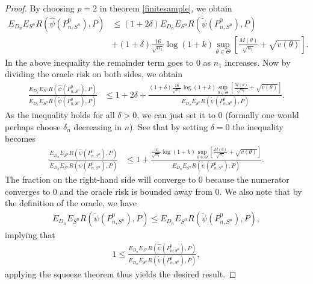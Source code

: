\documentclass[11pt, a4paper]{article}
\theoremstyle{definition}
\theoremstyle{remark}
\newcommand{\btheta}{\theta}
\newcommand{\la}{\psi}
\newcommand{\Sn}{S^n}
\begin{document}
\begin{proof}
    By choosing $ p = 2 $ in theorem \ref{finitesample}, we obtain
    \begin{align*}
        E_{D_n} E_{\Sn} R(\hat{\la}(P_{n, \Sn}^{0}), P) &\leq(1 + 2 \delta) E_{D_n} E_{\Sn} R(\tilde{\la}(P_{n,\Sn}^{0}), P)\\
                                                                 &+(1 + \delta) \frac{16}{\sqrt{n_1}} \log (1 +k) \sup_{\btheta \in \Theta} \left[ \frac{M(\theta)}{\sqrt{n_1}} + \sqrt{v(\theta)} \right].
    \end{align*}
    In the above inequality the remainder term goes to $ 0 $ as $ n_1 $ increases. Now by dividing the oracle risk on both sides, we obtain
    \begin{align*}
        \frac{E_{D_n} E_{\Sn} R(\hat{\la}(P_{n, \Sn}^{0}), P)}{E_{D_n} E_{\Sn} R(\tilde{\la}(P_{n,\Sn}^{0}), P)} 
        &\leq 
        1 + 2 \delta 
        + 
        \frac{(1 + \delta)\frac{16}{\sqrt{n_1}} \log (1 +k) \sup_{\btheta \in \Theta} \left[ \frac{M(\theta)}{\sqrt{n_1}} + \sqrt{v(\theta)} \right]}{E_{D_n} E_{\Sn} R( \tilde{\la}(P_{n,\Sn}^{0}), P)} .
    \end{align*}
    As the inequality holds for all $ \delta > 0 $, we can just set it to 0 (formally one would perhaps choose $ \delta_n $ decreasing in $ n $). See that by setting $ \delta = 0 $ the inequality becomes 
    \begin{align*}
        \frac{E_{D_n} E_{\Sn} R(\hat{\la}(P_{n, \Sn}^{0}), P)}{E_{D_n} E_{\Sn} R(\tilde{\la}(P_{n,\Sn}^{0}), P)} 
        &\leq
        1 
        + 
        \frac{\frac{16}{\sqrt{n_1}} \log (1 +k) \sup_{\btheta \in \Theta} \left[ \frac{M(\theta)}{\sqrt{n_1}} + \sqrt{v(\theta)} \right]}{E_{D_n} E_{\Sn} R(\tilde{\la}(P_{n,\Sn}^{0}), P)}.
    \end{align*}
    The fraction on the right-hand side will converge to $0$ because the numerator converges to $ 0 $ and the oracle risk is bounded away from $ 0 $. We also note that by the definition of the oracle, we have 
    \begin{align*}
        E_{D_n} E_{\Sn} R(\tilde{\la}(P_{n,\Sn}^{0}), P) \leq E_{D_n} E_{\Sn} R(\tilde{\la}(P_{n,\Sn}^{0}), P),
    \end{align*}
    implying that 
        \begin{align*}
            1 \leq \frac{E_{D_n} E_{\Sn} R(\hat{\la}(P_{n, \Sn}^{0}), P)}{E_{D_n} E_{\Sn} R(\tilde{\la}(P_{n,\Sn}^{0}), P)}, 
    \end{align*}
    applying the squeeze theorem thus yields the desired result.         
\end{proof}
\end{document}
